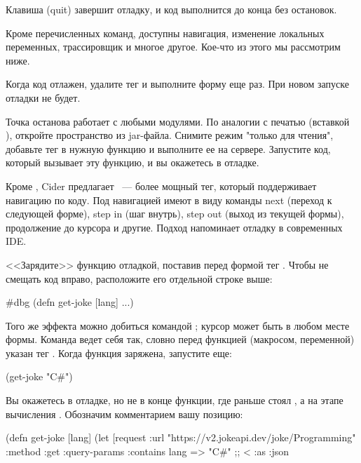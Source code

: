 Клавиша  (quit) завершит отладку, и код выполнится до конца без остановок.

Кроме перечисленных команд, доступны навигация, изменение локальных переменных, трассировщик и многое другое. Кое-что из этого мы рассмотрим ниже.

Когда код отлажен, удалите тег  и выполните форму еще раз. При новом запуске отладки не будет.

Точка останова работает с любыми модулями. По аналогии с печатью (вставкой ), откройте пространство из jar-файла. Снимите режим "только для чтения", добавьте тег  в нужную функцию и выполните ее на сервере. Запустите код, который вызывает эту функцию, и вы окажетесь в отладке.

Кроме , Cider предлагает ~--- более мощный тег, который поддерживает навигацию по коду. Под навигацией имеют в виду команды next (переход к следующей форме), step in (шаг внутрь), step out (выход из текущей формы), продолжение до курсора и другие. Подход напоминает отладку в современных IDE.

<<Зарядите>> функцию отладкой, поставив перед формой  тег . Чтобы не смещать код вправо, расположите его отдельной строке выше:

\begin{english}
  \begin{clojure}
#dbg
(defn get-joke [lang]
  ...)
  \end{clojure}
\end{english}

Того же эффекта можно добиться командой ; курсор может быть в любом месте формы. Команда ведет себя так, словно перед функцией (макросом, переменной) указан тег . Когда функция заряжена, запустите еще:

\begin{english}
  \begin{clojure}
(get-joke "C#")
  \end{clojure}
\end{english}

Вы окажетесь в отладке, но не в конце функции, где раньше стоял , а на этапе вычисления . Обозначим комментарием вашу позицию:

\begin{english}
  \begin{clojure}
(defn get-joke [lang]
  (let [request
        {:url "https://v2.jokeapi.dev/joke/Programming"
         :method :get
         :query-params {:contains lang} => "C#" ;; <
         :as :json}
  \end{clojure}
\end{english}

